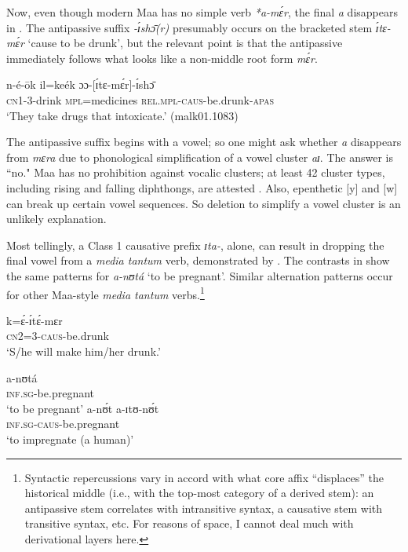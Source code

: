 \documentclass[output=paper,colorlinks,citecolor=brown
]{langscibook}
\begin{document}
Now, even though modern Maa has no simple verb \textit{*a-mɛ́r}, the final \textit{a} disappears in . The antipassive suffix \textit{-ɪ́shɔ̄(r)} presumably occurs on the bracketed stem \textit{ɪ́tɛ-mɛ́r} ‘cause to be drunk’, but the relevant point is that the antipassive immediately follows what looks like a non-middle root form \textit{mɛ́r}. 

\ea \label{ex:Payne:drunk-apas}
\gll n-é-ōk il=keék ɔɔ-[ɪ́tɛ-mɛ́r]-ɪ́shɔ̄ \\	
\textsc{cn1}-3-drink 	\textsc{mpl}=medicines \textsc{rel.mpl-caus}-be.drunk-\textsc{apas}\\
\glt ‘They take drugs that intoxicate.’ (malk01.1083)
\z 

The antipassive suffix begins with a vowel; so one might ask whether \emph{a} disappears from \textit{mɛra} due to phonological simplification of a vowel cluster \emph{aɪ}. The answer is ``no." Maa has no prohibition against vocalic clusters; at least 42 cluster types, including rising and falling diphthongs, are attested \citep{GriscomPayne2017}. Also, epenthetic [y] and [w] can break up certain vowel sequences. So deletion to simplify a vowel cluster is an unlikely explanation.

Most tellingly, a Class 1 causative prefix \emph{ɪta-}, alone, can result in dropping the final vowel from a \emph{media tantum} verb, demonstrated by . The contrasts in  show the same patterns for \textit{a-nʊtá} `to be pregnant'. Similar alternation patterns occur for other Maa-style \textit{media tantum} verbs.\footnote{Syntactic repercussions vary in accord with what core affix “displaces” the historical middle (i.e., with  the top-most category of a  derived stem): an antipassive stem correlates with intransitive syntax, a causative stem with transitive syntax, etc. For reasons of space, I cannot deal much with derivational layers here.}

\ea\label{ex:Payne:drunk-caus}
\gll k=ɛ́-ɪ́tɛ́-mɛr\\
\textsc{cn2=3-caus}-be.drunk\\
\glt `S/he will make him/her drunk.'
\z 

\ea \label{ex:Payne:pregnant}
\begin{xlist}
\ex 
\gll a-nʊtá \\
\textsc{inf.sg}-be.pregnant\\
\glt ‘to be pregnant’
\ex *a-nʊ́t
\ex 
\gll a-ɪtʊ-nʊ́t 	\\
\textsc{inf.sg-caus}-be.pregnant \\	
\glt `to impregnate (a human)’ 
\end{xlist}
\z 
\end{document}
